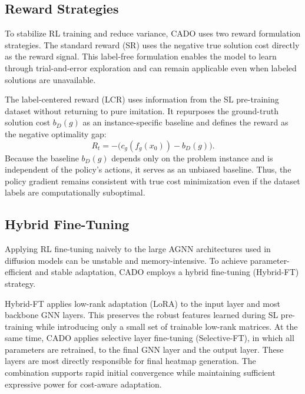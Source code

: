 \subsection{Reward Strategies}
\label{subsec:cado-reward-strategies}

To stabilize RL training and reduce variance, CADO uses two reward formulation strategies.
The standard reward (SR) uses the negative true solution cost directly as the reward signal.
This label-free formulation enables the model to learn through trial-and-error exploration and
can remain applicable even when labeled solutions are unavailable.

The label-centered reward (LCR) uses information from the SL pre-training dataset without
returning to pure imitation. It repurposes the ground-truth solution cost $b_D(g)$ as an
instance-specific baseline and defines the reward as the negative optimality gap:
\[
R_t = -\big(c_g(f_g(x_0)) - b_D(g)\big).
\]
Because the baseline $b_D(g)$ depends only on the problem instance and is independent of the
policy's actions, it serves as an unbiased baseline. Thus, the policy gradient remains
consistent with true cost minimization even if the dataset labels are computationally
suboptimal.

\subsection{Hybrid Fine-Tuning}
\label{subsec:cado-hybrid-ft}

Applying RL fine-tuning naively to the large AGNN architectures used in diffusion models can
be unstable and memory-intensive. To achieve parameter-efficient and stable adaptation, CADO
employs a hybrid fine-tuning (Hybrid-FT) strategy.

Hybrid-FT applies low-rank adaptation (LoRA) to the input layer and most backbone GNN layers.
This preserves the robust features learned during SL pre-training while introducing only a
small set of trainable low-rank matrices. At the same time, CADO applies selective layer
fine-tuning (Selective-FT), in which all parameters are retrained, to the final GNN layer and
the output layer. These layers are most directly responsible for final heatmap generation. The
combination supports rapid initial convergence while maintaining sufficient expressive power
for cost-aware adaptation.

